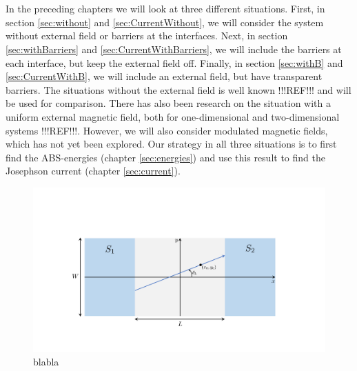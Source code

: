 \\
\\
In the preceding chapters we will look at three different situations. First, in section \ref{sec:without} and \ref{sec:CurrentWithout}, we will consider the system without external field or barriers at the interfaces. Next, in section \ref{sec:withBarriers} and \ref{sec:CurrentWithBarriers}, we will include the barriers at each interface, but keep the external field off. Finally, in section \ref{sec:withB} and \ref{sec:CurrentWithB}, we will include an external field, but have transparent barriers. The situations without the external field is well known !!!REF!!! and will be used for comparison. There has also been research on the situation with a uniform external magnetic field, both for one-dimensional and two-dimensional systems !!!REF!!!. However, we will also consider modulated magnetic fields, which has not yet been explored. Our strategy in all three situations is to first find the ABS-energies (chapter \ref{sec:energies}) and use this result to find the Josephson current (chapter \ref{sec:current}).

\begin{figure}[hhh]
\centering
\includegraphics[width=15cm,trim = 4cm 3cm 5cm 5.5cm, clip=true ]{fig/Explaination}
\caption{blabla}
\label{fig:Explaination}
\end{figure}